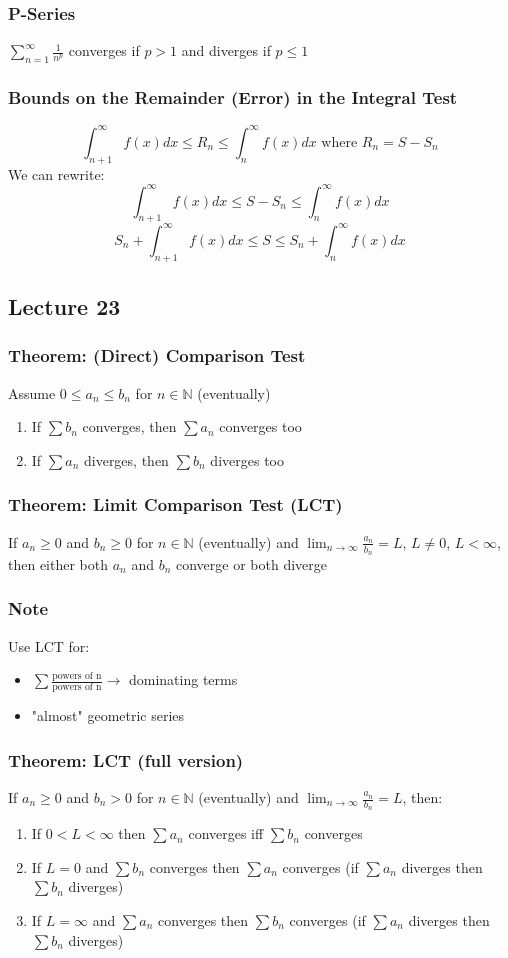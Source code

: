 \documentclass[12pt, letterpaper]{article}
\begin{document}
\subsubsection{P-Series}
$\displaystyle\sum_{n=1}^{\infty}\frac{1}{n^p}$ converges if $p>1$ and diverges if $p\leq 1$
\subsubsection{Bounds on the Remainder (Error) in the Integral Test}
\[\int_{n+1}^{\infty}f(x)dx \leq R_n \leq \int_{n}^{\infty}f(x)dx\text{ where $R_n = S-S_n$}\]
We can rewrite:
\[\int_{n+1}^{\infty}f(x)dx \leq S-S_n \leq \int_{n}^{\infty}f(x)dx\]
\[S_n+\int_{n+1}^{\infty}f(x)dx \leq S \leq S_n+\int_{n}^{\infty}f(x)dx\]
\subsection{Lecture 23}
\subsubsection{Theorem: (Direct) Comparison Test}
Assume $0\leq a_n\leq b_n$ for $n\in\mathbb{N}$ (eventually)
\begin{enumerate}
    \item If $\sum b_n$ converges, then $\sum a_n$ converges too 
    \item If $\sum a_n$ diverges, then $\sum b_n$ diverges too 
\end{enumerate}
\subsubsection{Theorem: Limit Comparison Test (LCT)}
If $a_n\geq 0$ and $b_n\geq 0$ for $n\in\mathbb{N}$ (eventually) and $\displaystyle\lim_{n\to\infty}\frac{a_n}{b_n} = L$, 
$L\neq0$, $L<\infty$, then either both $a_n$ and $b_n$ converge or both diverge
\subsubsection*{Note}
Use LCT for:
\begin{itemize}
    \item $\displaystyle\sum\frac{\text{powers of n}}{\text{powers of n}} \rightarrow$ dominating terms
    \item "almost" geometric series
\end{itemize}
\subsubsection{Theorem: LCT (full version)}
If $a_n\geq 0$ and $b_n > 0$ for $n\in\mathbb{N}$ (eventually) and $\displaystyle\lim_{n\to\infty}\frac{a_n}{b_n} = L$, then:
\begin{enumerate}
    \item If $0<L<\infty$ then $\sum a_n$ converges iff $\sum b_n$ converges 
    \item If $L=0$ and $\sum b_n$ converges then $\sum a_n$ converges (if $\sum a_n$ diverges then $\sum b_n$ diverges)
    \item If $L=\infty$ and $\sum a_n$ converges then $\sum b_n$ converges (if $\sum a_n$ diverges then $\sum b_n$ diverges)
\end{enumerate}
\end{document}
